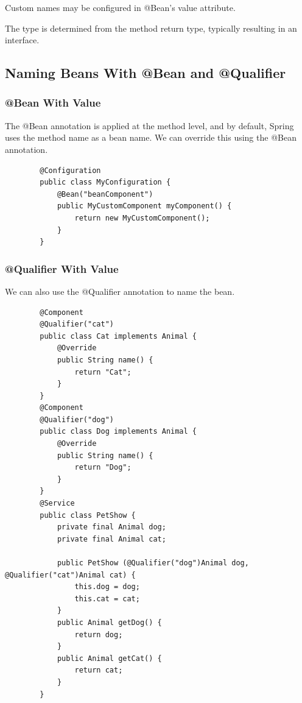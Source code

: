 \documentclass{scrartcl}
\begin{document}
   Custom names may be configured in @Bean's value attribute.

   The type is determined from the method return type, typically resulting in an interface.

\subsection{Naming Beans With @Bean and @Qualifier}
\subsubsection{@Bean With Value}
    The @Bean annotation is applied at the method level, and by default, Spring uses the method name as a bean name. We can override this using the @Bean annotation.

     \begin{lstlisting}
        @Configuration
        public class MyConfiguration {
            @Bean("beanComponent")
            public MyCustomComponent myComponent() {
                return new MyCustomComponent();
            }
        }
    \end{lstlisting}

\subsubsection{@Qualifier With Value}
    We can also use the @Qualifier annotation to name the bean.

    \begin{lstlisting}
        @Component
        @Qualifier("cat")
        public class Cat implements Animal {
            @Override
            public String name() {
                return "Cat";
            }
        }
        @Component
        @Qualifier("dog")
        public class Dog implements Animal {
            @Override
            public String name() {
                return "Dog";
            }
        }
        @Service
        public class PetShow {
            private final Animal dog;
            private final Animal cat;

            public PetShow (@Qualifier("dog")Animal dog, @Qualifier("cat")Animal cat) {
                this.dog = dog;
                this.cat = cat;
            }
            public Animal getDog() {
                return dog;
            }
            public Animal getCat() {
                return cat;
            }
        }
        \end{lstlisting}
\end{document}
